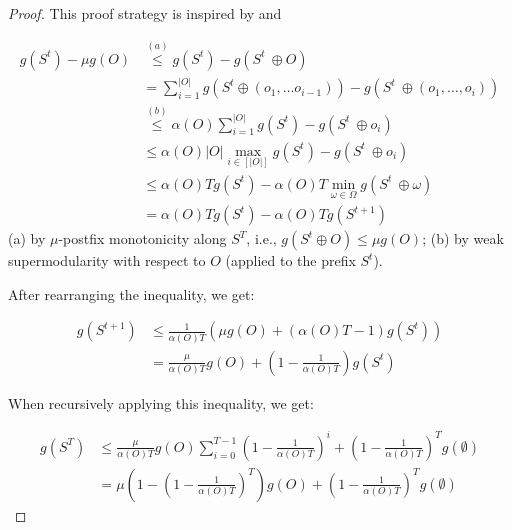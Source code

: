 \documentclass{article}
\begin{document}
\begin{proof}

This proof strategy is inspired by \citet{streeter2008online} and \citet{liberty2017greedy}

\begin{align*}
    g(S^t) - \mu g(O) &\overset{(a)}{\leq} g(S^t) - g(S^t\ \oplus O) \\
    &=\sum_{i = 1}^{|O|} g(S^t \oplus \left(o_1, \dots o_{i - 1}\right)) -g(S^t\ \oplus \left(o_1, \dots, o_{i}\right))\\
    &\overset{(b)}{\leq}  \alpha(O)\sum_{i = 1}^{|O|} g(S^t) -g(S^t\ \oplus  o_{i}) \\
    &\leq \alpha(O)|O|\max_{i \in [|O|]} g(S^t) -g(S^t\ \oplus  o_{i}) \\
    &\leq \alpha(O) T g(S^t) -  \alpha(O) T\min_{\omega \in \Omega} g(S^t\ \oplus  \omega) \\
    &= \alpha(O) Tg(S^t) -  \alpha(O) Tg(S^{t + 1})
\end{align*}
(a) by $\mu$-postfix monotonicity along $S^T$, i.e., $g(S^t \oplus O) \le \mu g(O)$; (b) by weak supermodularity with respect to $O$ (applied to the prefix $S^t$). 

After rearranging the inequality, we get:

\begin{align*}
    g(S^{t + 1}) &\leq \frac{1}{\alpha(O) T}\left(\mu g(O) +  \left(\alpha(O) T - 1\right)g(S^t)\right) \\
    &= \frac{\mu}{\alpha(O) T}g(O) + \left(1 - \frac{1}{\alpha(O) T}\right)g(S^t)
\end{align*}

When recursively applying this inequality, we get:

\begin{align*}
     g(S^{T}) &\leq \frac{\mu}{\alpha(O) T}g(O)\sum_{i = 0}^{T - 1}\left(1 - \frac{1}{\alpha(O) T}\right)^i + \left(1 - \frac{1}{\alpha(O) T}\right)^Tg(\emptyset) \\
     &= \mu\left(1 - \left(1 - \frac{1}{\alpha(O) T}\right)^T\right)g(O) + \left(1 - \frac{1}{\alpha(O) T}\right)^Tg(\emptyset)
\end{align*}


\end{proof}
\end{document}

